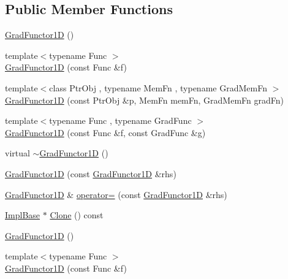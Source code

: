 \subsection*{Public Member Functions}
\begin{DoxyCompactItemize}
\item 
\mbox{\hyperlink{classROOT_1_1Math_1_1GradFunctor1D_a8691d070a442abf40d5709588edf93fe}{Grad\+Functor1D}} ()
\item 
{\footnotesize template$<$typename Func $>$ }\\\mbox{\hyperlink{classROOT_1_1Math_1_1GradFunctor1D_a740a6020efe7284e5eca301a89a127e8}{Grad\+Functor1D}} (const Func \&f)
\item 
{\footnotesize template$<$class Ptr\+Obj , typename Mem\+Fn , typename Grad\+Mem\+Fn $>$ }\\\mbox{\hyperlink{classROOT_1_1Math_1_1GradFunctor1D_a651aeef91a3d1a3ae323969d7239ebb2}{Grad\+Functor1D}} (const Ptr\+Obj \&p, Mem\+Fn mem\+Fn, Grad\+Mem\+Fn grad\+Fn)
\item 
{\footnotesize template$<$typename Func , typename Grad\+Func $>$ }\\\mbox{\hyperlink{classROOT_1_1Math_1_1GradFunctor1D_a30baab2a961d896e4aab6e60ed30d260}{Grad\+Functor1D}} (const Func \&f, const Grad\+Func \&g)
\item 
virtual \mbox{\hyperlink{classROOT_1_1Math_1_1GradFunctor1D_ac711d3cc551b961aa16ecdcbf50308d6}{$\sim$\+Grad\+Functor1D}} ()
\item 
\mbox{\hyperlink{classROOT_1_1Math_1_1GradFunctor1D_af43388b384674d1e811cfbc1ad562816}{Grad\+Functor1D}} (const \mbox{\hyperlink{classROOT_1_1Math_1_1GradFunctor1D}{Grad\+Functor1D}} \&rhs)
\item 
\mbox{\hyperlink{classROOT_1_1Math_1_1GradFunctor1D}{Grad\+Functor1D}} \& \mbox{\hyperlink{classROOT_1_1Math_1_1GradFunctor1D_a3ea006d92100ba76a6fae9f57499c60d}{operator=}} (const \mbox{\hyperlink{classROOT_1_1Math_1_1GradFunctor1D}{Grad\+Functor1D}} \&rhs)
\item 
\mbox{\hyperlink{classROOT_1_1Math_1_1GradFunctor1D_a16b436a0d100aa6c16ee66961c4f5b97}{Impl\+Base}} $\ast$ \mbox{\hyperlink{classROOT_1_1Math_1_1GradFunctor1D_ab8280aaf240a374fb7a67808d858af79}{Clone}} () const
\item 
\mbox{\hyperlink{classROOT_1_1Math_1_1GradFunctor1D_a8691d070a442abf40d5709588edf93fe}{Grad\+Functor1D}} ()
\item 
{\footnotesize template$<$typename Func $>$ }\\\mbox{\hyperlink{classROOT_1_1Math_1_1GradFunctor1D_a740a6020efe7284e5eca301a89a127e8}{Grad\+Functor1D}} (const Func \&f)

\end{DoxyCompactItemize}
